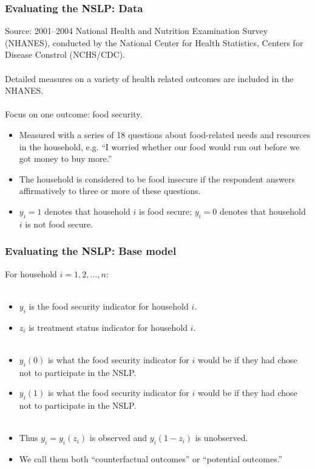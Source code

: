 \documentclass[xcolor=dvipsnames]{beamer}
\begin{document}
\begin{frame}
\frametitle{Evaluating the NSLP: Data}
Source: 2001--2004 National Health and Nutrition Examination Survey (NHANES), conducted by the National Center for Health Statistics, Centers for Disease Constrol (NCHS/CDC).\\~\\

Detailed measures on a variety of health related outcomes are included in the NHANES.\\~\\

\pause Focus on one outcome: food security.

\begin{itemize}
\item Measured with a series of 18 questions about food-related needs and resources in the household, e.g. ``I worried whether our food would run out before we got money to buy more.'' 
\item The household is considered to be food insecure if the respondent answers affirmatively to three or more of these questions.
\item $y_i=1$ denotes that household $i$ is food secure; $y_i=0$ denotes that household $i$ is not food secure.
\end{itemize}
\end{frame}
    
\begin{frame}
  \frametitle{Evaluating the NSLP: Base model}
  For household $i=1,2,...,n$:\\~\\
\begin{itemize}
  \item $y_i$ is the food security indicator for household $i$. 
  \item $z_i$ is treatment status indicator for household $i$.\pause\\~
  \item $y_i(0)$ is what the food security indicator for $i$ would be if they had chose not to participate in the NSLP.
  \item $y_i(1)$ is what the food security indicator for $i$ would be if they had chose not to participate in the NSLP.\pause\\~
  \item Thus $y_i = y_i(z_i)$ is observed and $y_i(1-z_i)$ is unobserved. 
  \item We call them both ``counterfactual outcomes'' or ``potential outcomes.''
\end{itemize}
\end{frame}
\end{document}
